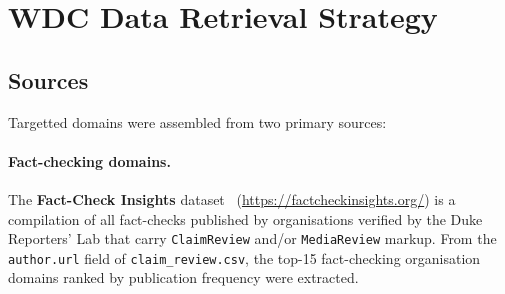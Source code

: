 \documentclass[11pt,a4paper]{article}
\begin{document}






\section{WDC Data Retrieval Strategy}
\label{sec:retrieval}
\subsection{Sources}

Targetted domains were assembled from two primary sources:

\paragraph{Fact-checking domains.}
The \textbf{Fact-Check Insights} dataset~\citep{factcheckinsights2024}
(\url{https://factcheckinsights.org/}) is a compilation of all fact-checks
published by organisations verified by the Duke Reporters' Lab that carry
\texttt{ClaimReview} and/or \texttt{MediaReview} markup.  From the
\texttt{author.url} field of \texttt{claim\_review.csv}, the top-15
fact-checking organisation domains ranked by publication frequency were
extracted.
\end{document}
